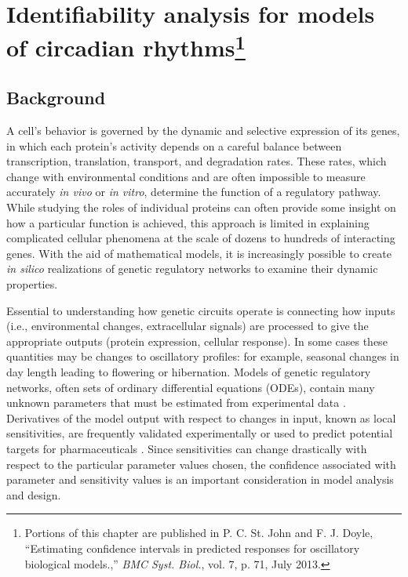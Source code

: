 \chapter[Identifiability analysis for models of circadian rhythms]{
  Identifiability analysis for models of circadian rhythms\footnote{
    Portions of this chapter are published in P. C. St. John and F. J. Doyle, ``Estimating confidence intervals in predicted responses for oscillatory biological models.,'' {\itshape BMC Syst. Biol.}, vol. 7, p. 71, July 2013.}}

\section{Background}
A cell's behavior is governed by the dynamic and selective expression of its
genes, in which each protein's activity depends on a careful balance between
transcription, translation, transport, and degradation rates. These rates, which
change with environmental conditions and are often impossible to measure
accurately {\itshape in vivo} or {\itshape in vitro}, determine the function of
a regulatory pathway. While studying the roles of individual proteins can often
provide some insight on how a particular function is achieved, this approach is
limited in explaining complicated cellular phenomena at the scale of dozens to
hundreds of interacting genes. With the aid of mathematical models, it is
increasingly possible to create {\itshape in silico} realizations of genetic
regulatory networks to examine their dynamic properties.

Essential to understanding how genetic circuits operate is connecting how
inputs (i.e., environmental changes, extracellular signals) are processed to
give the appropriate outputs (protein expression, cellular response). In some
cases these quantities may be changes to oscillatory profiles: for example,
seasonal changes in day length leading to flowering or hibernation. Models of
genetic regulatory networks, often sets of ordinary differential equations
(ODEs), contain many unknown parameters that must be estimated from
experimental data \cite{Gutenkunst2007}. Derivatives of the model output with
respect to changes in input, known as local sensitivities, are frequently
validated experimentally or used to predict potential targets for
pharmaceuticals \cite{Kell2006}. Since sensitivities can change drastically
with respect to the particular parameter values chosen, the confidence
associated with parameter and sensitivity values is an important consideration
in model analysis and design.

